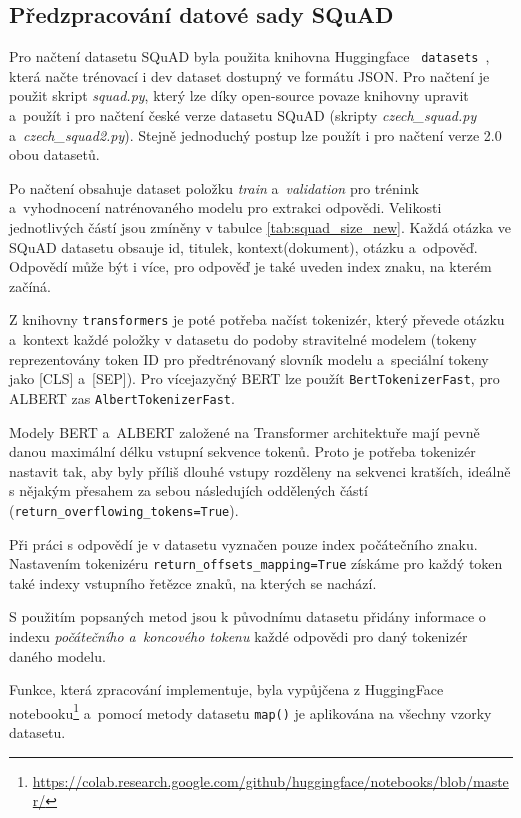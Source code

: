 \subsection{Předzpracování datové sady SQuAD}
Pro načtení datasetu SQuAD byla použita knihovna Huggingface \texttt{ datasets }, která načte trénovací i dev dataset dostupný ve formátu JSON. Pro načtení je použit skript \emph{squad.py}, který lze díky open-source povaze knihovny upravit a~použít i pro načtení české verze datasetu SQuAD \cite{cz_suqad_download} (skripty \emph{czech\_squad.py} a~\emph{czech\_squad2.py}). Stejně jednoduchý postup lze použít i pro načtení verze 2.0 obou datasetů.\par
Po načtení obsahuje dataset položku \emph{train} a~\emph{validation} pro trénink a~vyhodnocení natrénovaného modelu pro extrakci odpovědi. Velikosti jednotlivých částí jsou zmíněny v tabulce \ref{tab:squad_size_new}. Každá otázka ve SQuAD datasetu obsauje id, titulek, kontext(dokument), otázku a~odpověď. Odpovědí může být i více, pro odpověď je také uveden index znaku, na kterém začíná.\par
Z knihovny \texttt{transformers} je poté potřeba načíst tokenizér, který převede otázku a~kontext každé položky v datasetu do podoby stravitelné modelem (tokeny reprezentovány token ID pro předtrénovaný slovník modelu a~speciální tokeny jako [CLS] a~[SEP]). Pro více\-jazyčný BERT lze použít \texttt{BertTokenizerFast}, pro ALBERT zas \texttt{AlbertTokenizerFast}.\par
\pagebreak
Modely BERT a~ALBERT založené na Transformer architektuře mají pevně danou maximální délku vstupní sekvence tokenů. Proto je potřeba tokenizér nastavit tak, aby byly příliš dlouhé vstupy rozděleny na sekvenci kratších, ideálně s nějakým přesahem za sebou následujích oddělených částí (\texttt{return\_overflowing\_tokens=True}).\par
Při práci s odpovědí je v datasetu vyznačen pouze index počátečního znaku. Nastavením tokenizéru \texttt{return\_offsets\_mapping=True} získáme pro každý token také indexy vstupního řetězce znaků, na kterých se nachází.\par
S použitím popsaných metod jsou k původnímu datasetu přidány informace o indexu \emph{počátečního a~koncového tokenu} každé odpovědi pro daný tokenizér daného modelu.\par 
Funkce, která zpracování implementuje, byla vypůjčena z HuggingFace notebooku\footnote{\url{https://colab.research.google.com/github/huggingface/notebooks/blob/master/}} a~pomocí metody datasetu \texttt{map()} je aplikována na všechny vzorky datasetu.

